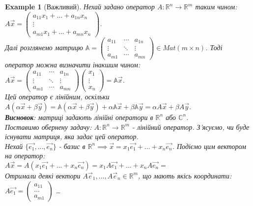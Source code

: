\documentclass[a4paper, 10pt]{article}
\def\huge{\displaystyle}
\theoremstyle{theoremdd}
\theoremstyle{theoremdd}
\theoremstyle{theoremdd}
\theoremstyle{theoremdd}
\newtheorem{example}[theorem]{Example}
\theoremstyle{theoremdd}
\theoremstyle{theoremdd}
\theoremstyle{theoremdd}
\theoremstyle{theoremdd}
\begin{document}
	\begin{example}[Важливий]
	Нехай задано оператор $A: \mathbb{R}^n \to \mathbb{R}^m$ таким чином:\\
	$A\vec{x} = \begin{pmatrix}
	a_{11}x_1 + \dots + a_{1n}x_n \\
	\vdots \\
	a_{m1}x_1 + \dots + a_{mn}x_n
	\end{pmatrix}$.\\
	Далі розглянемо матрицю $\huge \mathbb{A} = \begin{pmatrix}
	a_{11} & \cdots &  a_{1n} \\
	\vdots & \ddots & \vdots \\
	a_{m1} & \cdots & a_{mn}
	\end{pmatrix} \in Mat(m \times n)
	$. Тоді оператор можна визначити інакшим чином:\\
	$A\vec{x} = \begin{pmatrix}
	a_{11} & \cdots &  a_{1n} \\
	\vdots & \ddots & \vdots \\
	a_{m1} & \cdots & a_{mn}
	\end{pmatrix} \begin{pmatrix}
	x_1 \\ \vdots \\ x_n
	\end{pmatrix} = \mathbb{A} \vec{x}$.\\
	Цей оператор є лінійним, оскільки $A(\alpha \vec{x} + \beta \vec{y}) = \mathbb{A}(\alpha \vec{x} + \beta \vec{y})+ \alpha \mathbb{A} \vec{x} + \beta \mathbb{A} \vec{y} = \alpha A \vec{x} + \beta A \vec{y}$.\\
	\textbf{Висновок}: матриці задають лінійні оператори в $\mathbb{R}^n$ або $\mathbb{C}^n$.
	\bigskip \\
	Поставимо обернену задачу: $A: \mathbb{R}^n \to \mathbb{R}^m$ - лінійний оператор. З'ясуємо, чи буде існувати матриця, яка задає цей оператор.\\
	Нехай $\{\vec{e_1},\dots, \vec{e_n}\}$ - базис в $\mathbb{R}^n \implies \vec{x} = x_1\vec{e_1} + \dots + x_n\vec{e_n}$. Подіємо цим вектором на оператор:\\
	$A\vec{x} = A(x_1\vec{e_1} + \dots + x_n\vec{e_n}) = x_1A\vec{e_1} + \dots + x_nA\vec{e_n} \boxed{=}$\\
	Отримали деякі вектори $A\vec{e}_1, \dots, A\vec{e}_n \in \mathbb{R}^m$, що мають якісь координати:\\
	$A\vec{e_1} = \begin{pmatrix} a_{11} \\ \dots \\ a_{m1} \end{pmatrix}$ \hspace{0.5cm} \dots \hspace{0.5cm}

\end{example}
\end{document}
